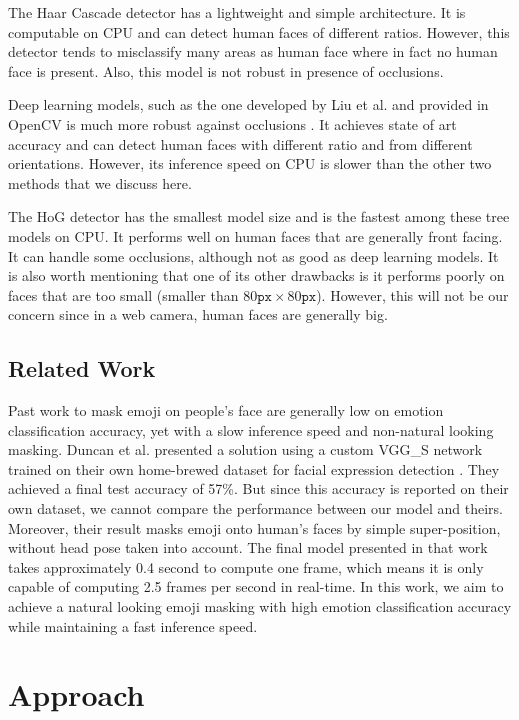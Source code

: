 \documentclass{article}
\begin{document}
The Haar Cascade detector has a lightweight and simple architecture. It is computable on CPU and can detect human faces of different ratios. However, this detector tends to misclassify many areas as human face where in fact no human face is present. Also, this model is not robust in presence of occlusions. 

Deep learning models, such as the one developed by Liu et al. and provided in OpenCV is much more robust against occlusions \cite{ssd}. It achieves state of art accuracy and can detect human faces with different ratio and from different orientations. However, its inference speed on CPU is slower than the other two methods that we discuss here. 

The HoG detector has the smallest model size and is the fastest among these tree models on CPU. It performs well on human faces that are generally front facing. It can handle some occlusions, although not as good as deep learning models. It is also worth mentioning that one of its other drawbacks is it performs poorly on faces that are too small (smaller than $80\texttt{px} \times 80\texttt{px}$). However, this will not be our concern since in a web camera, human faces are generally big. 

\subsection{Related Work}
Past work to mask emoji on people's face are generally low on emotion classification accuracy, yet with a slow inference speed and non-natural looking masking. Duncan et al. presented a solution using a custom VGG\_S network trained on their own home-brewed dataset for facial expression detection \cite{duncan_2016}. They achieved a final test accuracy of 57\%. But since this accuracy is reported on their own dataset, we cannot compare the performance between our model and theirs. Moreover, their result masks emoji onto human's faces by simple super-position, without head pose taken into account. The final model presented in that work takes approximately 0.4 second to compute one frame, which means it is only capable of computing 2.5 frames per second in real-time. In this work, we aim to achieve a natural looking emoji masking with high emotion classification accuracy while maintaining a fast inference speed. 

\section{Approach}
\end{document}
